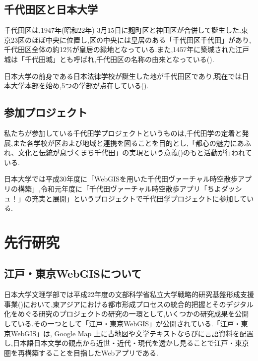 \documentclass[a4paper, twoside]{jarticle}
\begin{document}
\begin{multicols}{2}
\subsection{千代田区と日本大学}
千代田区は,1947年(昭和22年) 3月15日に麹町区と神田区が合併して誕生した.東京23区のほぼ中央に位置し,区の中央には皇居のある「千代田区千代田」があり,千代田区全体の約12\%が皇居の緑地となっている.また,1457年に築城された江戸城は「千代田城」とも呼ばれ,千代田区の名称の由来となっている(\cite{digi1}).\par
日本大学の前身である日本法律学校が誕生した地が千代田区であり,現在では日本大学本部を始め,5つの学部が点在している(\cite{digi2}).

\subsection{参加プロジェクト}
私たちが参加している千代田学プロジェクトというものは,千代田学の定着と発展,また各学校が区および地域と連携を図ることを目的とし,「都心の魅力にあふれ、文化と伝統が息づくまち千代田」の実現という意義(\cite{chiyopro})のもと活動が行われている.\par
日本大学では平成30年度に「WebGISを用いた千代田ヴァーチャル時空散歩アプリの構築」,令和元年度に「千代田ヴァーチャル時空散歩アプリ「ちよダッシュ！」の充実と展開」というプロジェクトで千代田学プロジェクトに参加している.


\section{先行研究}


\subsection{江戸・東京WebGISについて}
日本大学文理学部では平成22年度の文部科学省私立大学戦略的研究基盤形成支援事業(\cite{monka})において,東アジアにおける都市形成プロセスの統合的把握とそのデジタル化をめぐる研究のプロジェクトの研究の一環として,いくつかの研究成果を公開している.その一つとして「江戸・東京WebGIS」が公開されている.「江戸・東京WebGIS」は, Google Map 上に古地図や文学テキストならびに言語資料を配置し,日本語日本文学の観点から近世・近代・現代を透かし見ることで江戸・東京圏を再構築することを目指したWebアプリである.


\end{multicols}
\end{document}
